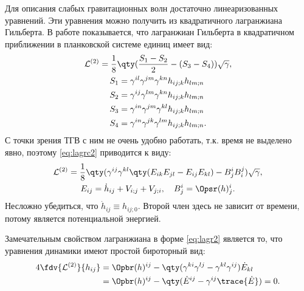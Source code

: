\documentclass[\docroot/reports/draft/report.tex]{subfiles}
\begin{document}
    Для описания слабых гравитационных волн достаточно линеаризованных уравнений. Эти уравнения можно получить из квадратичного лагранжиана Гильберта. В работе  показывается, что лагранжиан Гильберта в квадратичном приближении в планковской системе единиц имеет вид:
    \begin{equation}\label{eq:lagrc2}
        \begin{gathered}
            \mathcal{L}^{(2)} = \frac{1}{8} \qty(
                \frac{S_1 - S_2}{2} - (S_3 - S_4)
            ) \sqrt{\gamma}, \\
            \begin{aligned}
                S_1 &= \gamma^{il}\gamma^{jm}\gamma^{kn} h_{ij;k} h_{lm;n} \\
                S_2 &= \gamma^{ij}\gamma^{lm}\gamma^{kn} h_{ij;k} h_{lm;n} \\
                S_3 &= \gamma^{in}\gamma^{jm}\gamma^{kl} h_{ij;k} h_{lm;n} \\
                S_4 &= \gamma^{in}\gamma^{jk}\gamma^{lm} h_{ij;k} h_{lm;n} .
            \end{aligned}
        \end{gathered}
    \end{equation}
    С точки зрения ТГВ с ним не очень удобно работать, т.к. время не выделено явно, поэтому \autoref{eq:lagrc2} приводится к виду:
    \begin{equation}\label{eq:lagr2}
        \begin{gathered}
            \mathcal{L}^{(2)} = \frac{1}{8} \qty(
                \gamma^{ij} \gamma^{kl} \qty(
                    E_{ik} E_{jl} - E_{ij} E_{kl}
                ) - B^i_j B^j_i
            ) \sqrt{\gamma}, \\
            E_{ij} = \dot{h}_{ij} + V_{i;j} + V_{j;i}, \quad
            B^i_j = \Opsr(h)^i_j .
        \end{gathered}
    \end{equation}
    Несложно убедиться, что $\dot{h}_{ij} \equiv h_{ij;0}$. Второй член здесь не зависит от времени, потому является потенциальной энергией.

    Замечательным свойством лагранжиана в форме \autoref{eq:lagr2} является то, что уравнения динамики имеют простой бироторный вид:
    \begin{equation}\begin{aligned}\label{eq:lagr2var}
        4\fdv{\mathcal{L}^{(2)}}{h_{ij}} &= \Opbr(h)^{ij} -
        \qty(\gamma^{ki}\gamma^{lj} - \gamma^{kl}\gamma^{ij}) \dot{E}_{kl} \\
                   &= \Opbr(h)^{ij} - \qty(\dot{E}^{ij} - \gamma^{ij} \trace{\dot{E}}) = 0.
    \end{aligned}\end{equation}
\end{document}
